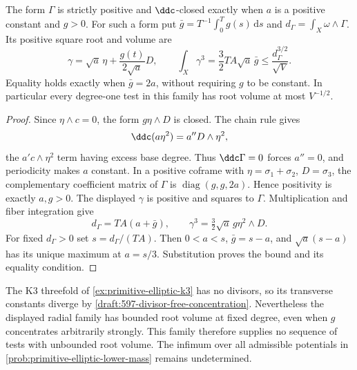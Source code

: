 \begin{proposition}\label{draft:597-primitive-radial-root-volume}
The form $\Gamma$ is strictly positive and $\ddc$-closed exactly when $a$ is a positive constant and $g>0$. For such a form put $\bar g=T^{-1}\int_0^Tg(s)\,\mathrm ds$ and $d_\Gamma=\int_X\omega\wedge\Gamma$. Its positive square root and volume are
\[
 \gamma=\sqrt a\,\eta+\frac{g(t)}{2\sqrt a}D,
 \qquad
 \int_X\gamma^3=\frac32TA\sqrt a\,\bar g
       \leq\frac{d_\Gamma^{3/2}}{\sqrt V}.
\]
Equality holds exactly when $\bar g=2a$, without requiring $g$ to be constant. In particular every degree-one test in this family has root volume at most $V^{-1/2}$.
\end{proposition}
\begin{proof}
Since $\eta\wedge c=0$, the form $g\eta\wedge D$ is closed. The chain rule gives
\[
 \ddc(a\eta^2)=a''D\wedge\eta^2,
\]
the $a'c\wedge\eta^2$ term having excess base degree. Thus $\ddc\Gamma=0$ forces $a''=0$, and periodicity makes $a$ constant. In a positive coframe with $\eta=\sigma_1+\sigma_2$, $D=\sigma_3$, the complementary coefficient matrix of $\Gamma$ is $\operatorname{diag}(g,g,2a)$. Hence positivity is exactly $a,g>0$.
The displayed $\gamma$ is positive and squares to $\Gamma$. Multiplication and fiber integration give
\[
 d_\Gamma=TA(a+\bar g),\qquad
 \gamma^3=\tfrac32\sqrt a\,g\eta^2\wedge D.
\]
For fixed $d_\Gamma>0$ set $s=d_\Gamma/(TA)$. Then $0<a<s$, $\bar g=s-a$, and $\sqrt a(s-a)$ has its unique maximum at $a=s/3$. Substitution proves the bound and its equality condition.
\end{proof}

The K3 threefold of \cref{ex:primitive-elliptic-k3} has no divisors, so its transverse constants diverge by \cref{draft:597-divisor-free-concentration}. Nevertheless the displayed radial family has bounded root volume at fixed degree, even when $g$ concentrates arbitrarily strongly. This family therefore supplies no sequence of tests with unbounded root volume. The infimum over all admissible potentials in \cref{prob:primitive-elliptic-lower-mass} remains undetermined.

